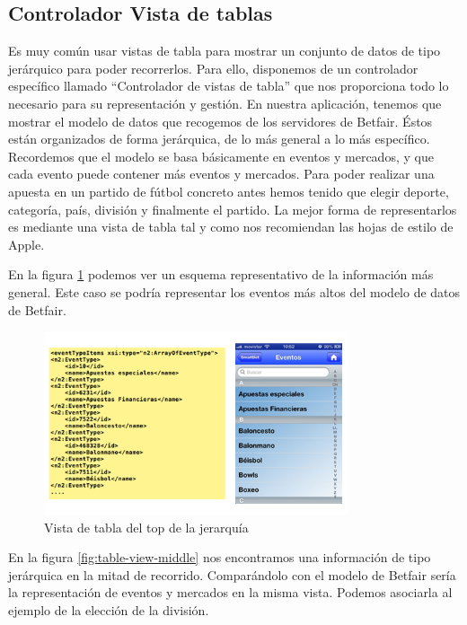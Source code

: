  \subsection{Controlador Vista de tablas}	

  Es muy común usar vistas de tabla para mostrar un conjunto de datos de tipo jerárquico para poder recorrerlos.  
  Para ello, disponemos de un controlador específico llamado ``Controlador de vistas de tabla'' que nos proporciona todo lo necesario para su representación y gestión. En nuestra aplicación, tenemos que mostrar el modelo de datos que recogemos de los servidores de Betfair. Éstos están organizados de forma jerárquica, de lo más general a lo más específico. Recordemos que el modelo se basa básicamente en eventos y mercados, y que cada evento puede contener más eventos y mercados. Para poder realizar una apuesta en un partido de fútbol concreto antes hemos tenido que elegir deporte, categoría, país, división y finalmente el partido. La mejor forma de representarlos es mediante una vista de tabla tal y como nos recomiendan las hojas de estilo de Apple.
  
   En la figura \ref{fig:table-view-top} podemos ver un esquema representativo de la información más general. Este caso se podría representar los eventos más altos del modelo de datos de Betfair.
  
 \begin{figure}[h!]
  \centering
    \includegraphics[width=0.8\textwidth]{./images/tabla_top.png}
  \caption{Vista de tabla del top de la jerarquía }
  \label{fig:table-view-top}
\end{figure} 

 En la figura \ref{fig:table-view-middle} nos encontramos una información de tipo jerárquica en la mitad de recorrido. Comparándolo con el modelo de Betfair sería la representación de eventos y mercados en la misma vista. Podemos asociarla al ejemplo de la elección de la división.

